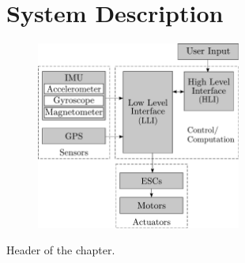 \chapter{System Description}

\begin{figure}[H]
    \includegraphics[width=0.6\textwidth]{figures/systemDiagram}
    \caption{}
    \label{fig:systemDiagram}
\end{figure}

Header of the chapter.

